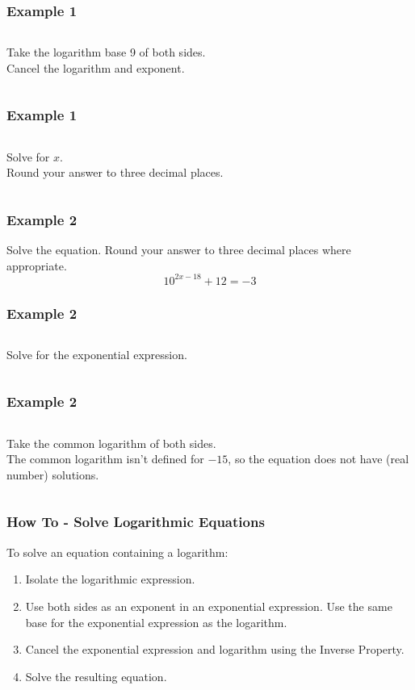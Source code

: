 \documentclass[aspectratio=169,17pt]{beamer}
\begin{document}
\begin{frame}
	\frametitle{Example 1}
	\begin{columns}
			Take the logarithm base 9 of both sides. \\ Cancel the logarithm and exponent.
			
	\end{columns}
\end{frame}

\begin{frame}
	\frametitle{Example 1}
	\begin{columns}
		\column{0.3\textwidth}
			Solve for $x$. \\ Round your answer to three decimal places.
		\column{0.7\textwidth}
			
	\end{columns}
\end{frame}

\begin{frame}[t]
	\frametitle{Example 2}
	Solve the equation. Round your answer to three decimal places where appropriate.
	$$10^{2x-18} + 12 = -3$$
\end{frame}

\begin{frame}
	\frametitle{Example 2}
	\begin{columns}
			Solve for the exponential expression.
			
	\end{columns}
\end{frame}

\begin{frame}
	\frametitle{Example 2}
	\begin{columns}
		 {\small
			Take the common logarithm of both sides. \\ 
			The common logarithm isn't defined for $-15$, 
			so the equation does not have (real number) solutions. }
		\column{0.7\textwidth}
			
	\end{columns}
\end{frame}

\begin{frame}
	\frametitle{How To - Solve Logarithmic Equations}
	To solve an equation containing a logarithm: \pause
	\begin{enumerate}
		\item Isolate the logarithmic expression. \pause
		\item Use both sides as an exponent in an exponential expression. Use the same base for the exponential expression as the logarithm. \pause
		\item Cancel the exponential expression and logarithm using the Inverse Property. \pause
		\item Solve the resulting equation.
	\end{enumerate}
\end{frame}
\end{document}
